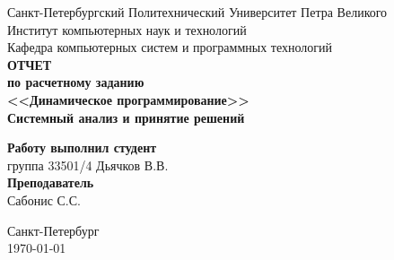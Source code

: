 \begin{titlepage}
\begin{center}
	Санкт-Петербургский Политехнический Университет Петра Великого\\[0.3cm]
	Институт компьютерных наук и технологий \\[0.3cm]
	Кафедра компьютерных систем и программных технологий\\[4cm]
	
	\textbf{ОТЧЕТ}\\ 
	\textbf{по расчетному заданию}\\[0.5cm]
	\textbf{<<Динамическое программирование>>}\\[0.1cm]
	\textbf{Системный анализ и принятие решений}\\[4.0cm]
\end{center}

\begin{flushright}
	\begin{minipage}{0.45\textwidth}
		\textbf{Работу выполнил студент}\\[3mm]
		группа 33501/4 \hspace*{6mm} Дьячков В.В.\\[5mm]
		\textbf{Преподаватель}\\[5mm]
		\sign[3.5cm] \hspace*{5mm} Сабонис С.С. \\[5mm]
	\end{minipage}
\end{flushright}

\vfill

\begin{center}
	Санкт-Петербург\\
	\today
\end{center}
\end{titlepage}

\addtocounter{page}{1}